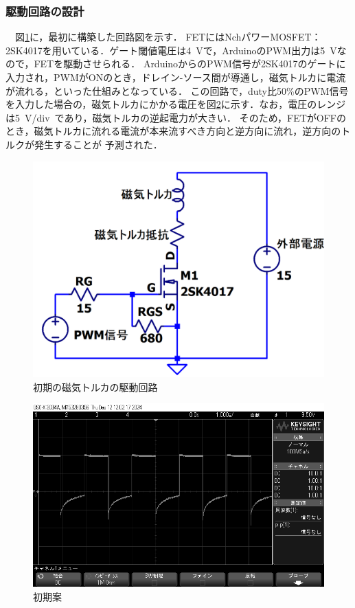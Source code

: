 \subsubsection{駆動回路の設計}
　図\ref{fig:cirkit1}に，最初に構築した回路図を示す．
FETにはNchパワーMOSFET：2SK4017を用いている．ゲート閾値電圧は4~Vで，ArduinoのPWM出力は5~Vなので，FETを駆動させられる．
ArduinoからのPWM信号が2SK4017のゲートに入力され，PWMがONのとき，ドレイン-ソース間が導通し，磁気トルカに電流が流れる，といった仕組みとなっている．
この回路で，duty比50\%のPWM信号を入力した場合の，磁気トルカにかかる電圧を図\ref{fig:osiro1}に示す．なお，電圧のレンジは5~V/div~であり，磁気トルカの逆起電力が大きい．
そのため，FETがOFFのとき，磁気トルカに流れる電流が本来流すべき方向と逆方向に流れ，逆方向のトルクが発生することが
予測された．

\begin{figure}[H]
	\centering
		\includegraphics[scale=0.3]{./figure/回路図1.png}
		\caption{初期の磁気トルカの駆動回路}
		\label{fig:cirkit1}
\end{figure}

\begin{figure}[H]
	\centering
		\includegraphics[scale=0.3]{./figure/scope_5.png}
		\caption{初期案}
		\label{fig:osiro1}
\end{figure}


